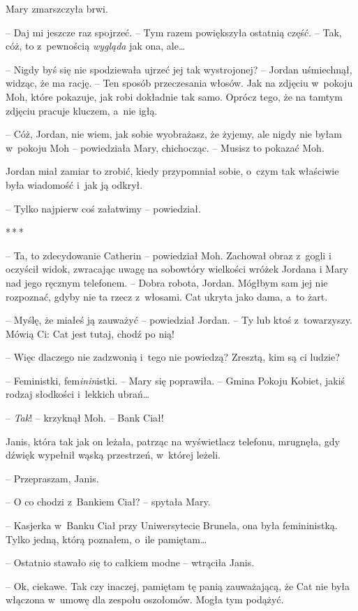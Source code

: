 \documentclass[oneside,polish,11pt,sfheadings]{mwbk}
\newcommand{\threeast}{\bigskip\par\centerline{*\,*\,*}\medskip\par}%
\begin{document}
Mary zmarszczyła brwi. 

-- Daj mi jeszcze raz spojrzeć. -- Tym razem
powiększyła ostatnią część. -- Tak, cóż, to z~pewnością \emph{wygląda}
jak ona, ale\ldots

-- Nigdy byś się nie spodziewała ujrzeć jej tak wystrojonej? -- Jordan
uśmiechnął, widząc, że ma rację. -- Ten sposób przeczesania włosów. Jak
na zdjęciu w~pokoju Moh, które pokazuje, jak robi dokładnie tak samo.
Oprócz tego, że na tamtym zdjęciu pracuje kluczem, a~nie igłą.

-- Cóż, Jordan, nie wiem, jak sobie wyobrażasz, że żyjemy, ale nigdy nie
byłam w~pokoju Moh -- powiedziała Mary, chichocząc. -- Musisz to pokazać
Moh.

Jordan miał zamiar to zrobić, kiedy przypomniał sobie, o~czym tak
właściwie była wiadomość i~jak ją odkrył.

-- Tylko najpierw coś załatwimy -- powiedział.
  \threeast 

-- Ta, to zdecydowanie Catherin -- powiedział Moh. Zachował obraz z~gogli
i oczyścił widok, zwracając uwagę na sobowtóry wielkości wróżek Jordana
i Mary nad jego ręcznym telefonem. -- Dobra robota, Jordan. Mógłbym sam
jej nie rozpoznać, gdyby nie ta rzecz z~włosami. Cat ukryta jako dama, a~to żart.

-- Myślę, że miałeś ją zauważyć -- powiedział Jordan. -- Ty lub ktoś z~towarzyszy. Mówią Ci: Cat jest tutaj, chodź po nią!

-- Więc dlaczego nie zadzwonią i~tego nie powiedzą? Zresztą, kim są ci
ludzie?

-- Feministki, fem\emph{inin}istki. -- Mary się poprawiła. -- Gmina Pokoju
Kobiet, jakiś rodzaj słodkości i~lekkich ubrań\ldots

-- \emph{Tak}! -- krzyknął Moh. -- Bank Ciał!

Janis, która tak jak on leżała, patrząc na wyświetlacz telefonu,
mrugnęła, gdy dźwięk wypełnił wąską przestrzeń, w~której leżeli.

-- Przepraszam, Janis.

-- O co chodzi z~Bankiem Ciał? -- spytała Mary.

-- Kasjerka w~Banku Ciał przy Uniwersytecie Brunela, ona była
femininistką. Tylko jedną, którą poznałem, o~ile pamiętam\ldots

-- Ostatnio stawało się to całkiem modne -- wtrąciła Janis.

-- Ok, ciekawe. Tak czy inaczej, pamiętam tę panią zauważającą, że Cat
nie była włączona w~umowę dla zespołu oszołomów. Mogła tym podążyć.
\end{document}
